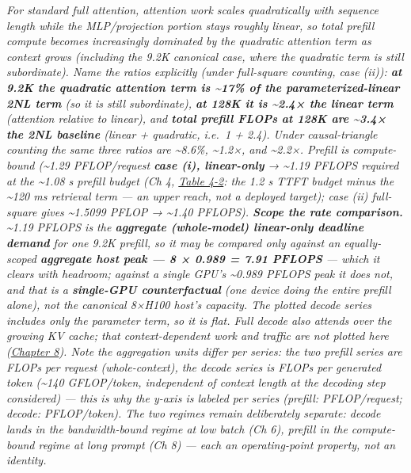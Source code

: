 \emph{For standard full attention, attention work scales quadratically
with sequence length while the MLP/projection portion stays roughly
linear, so total prefill compute becomes increasingly dominated by the
quadratic attention term as context grows (including the 9.2K canonical
case, where the quadratic term is still subordinate). Name the ratios
explicitly (under full-square counting, case (ii)): \textbf{at 9.2K the
quadratic attention term is \textasciitilde17\% of the
parameterized-linear 2NL term} (so it is still subordinate), \textbf{at
128K it is \textasciitilde2.4× the linear term} (attention relative to
linear), and \textbf{total prefill FLOPs at 128K are \textasciitilde3.4×
the 2NL baseline} (linear + quadratic, i.e.~1 + 2.4). Under
causal-triangle counting the same three ratios are \textasciitilde8.6\%,
\textasciitilde1.2×, and \textasciitilde2.2×. Prefill is compute-bound
(\textasciitilde1.29 PFLOP/request \textbf{case (i), linear-only} →
\textasciitilde1.19 PFLOPS required at the \textasciitilde1.08 s prefill
budget (Ch 4, \hyperref[tab:4.2]{Table 4-2}: the 1.2 s TTFT budget minus the
\textasciitilde120 ms retrieval term --- an upper reach, not a deployed
target); case (ii) full-square gives \textasciitilde1.5099 PFLOP →
\textasciitilde1.40 PFLOPS). \textbf{Scope the rate comparison.}
\textasciitilde1.19 PFLOPS is the \textbf{aggregate (whole-model)
linear-only deadline demand} for one 9.2K prefill, so it may be compared
only against an equally-scoped \textbf{aggregate host peak --- 8 × 0.989
= 7.91 PFLOPS} --- which it clears with headroom; against a
\emph{single} GPU's \textasciitilde0.989 PFLOPS peak it does not, and
that is a \textbf{single-GPU counterfactual} (one device doing the
entire prefill alone), not the canonical 8×H100 host's capacity. The
plotted decode series includes only the parameter term, so it is flat.
Full decode also attends over the growing KV cache; that
context-dependent work and traffic are not plotted here (\hyperref[chap:8]{Chapter 8}).
Note the aggregation units differ per series: the two prefill series are
FLOPs \emph{per request} (whole-context), the decode series is FLOPs
\emph{per generated token} (\textasciitilde140 GFLOP/token, independent
of context length at the decoding step considered) --- this is why the
y-axis is labeled per series (prefill: PFLOP/request; decode:
PFLOP/token). The two regimes remain deliberately separate: decode lands
in the bandwidth-bound regime at low batch (Ch 6), prefill in the
compute-bound regime at long prompt (Ch 8) --- each an operating-point
property, not an identity.}

